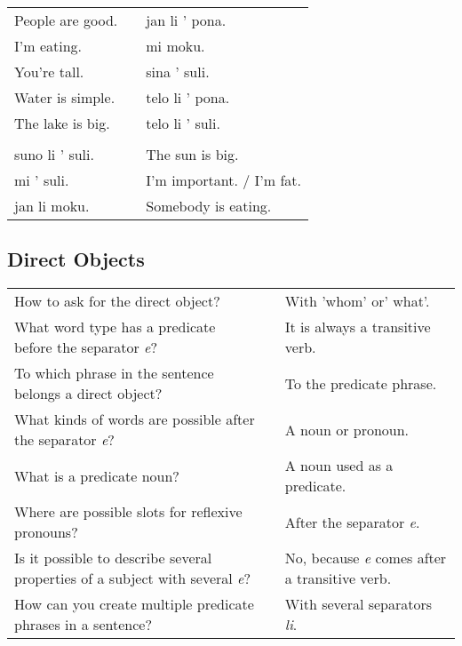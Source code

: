 \begin{supertabular}{p{5,5cm}|ll}
People are good. && jan li ' pona. \\ %
I'm eating. && mi moku. \\ %
You're tall. && sina ' suli. \\ %
Water is simple. && telo li ' pona. \\ %
The lake is big. && telo li ' suli. \\ %
 && \\ %
suno li ' suli. && The sun is big. \\
mi ' suli. && I'm important. / I'm fat. \\
jan li moku. && Somebody is eating. \\
\end{supertabular} 

\newpage
\subsection*{Direct Objects} 
\label{'direct_objects_compund_sentences'}
%
\begin{supertabular}{p{5,5cm}|ll}
How to ask for the direct object? && With 'whom' or' what'. \\ %
What word type has a predicate before the separator \textit{e}?  && It is always a transitive verb. \\ %
To which phrase in the sentence belongs a direct object? && To the predicate phrase. \\ %
What kinds of words are possible after the separator \textit{e}?  && A noun or pronoun. \\ %
What is a predicate noun?  && A noun used as a predicate. \\ %
Where are possible slots for reflexive pronouns? && After the separator \textit{e}. \\ %
Is it possible to describe several properties of a subject with several \textit{e}? && No, because \textit{e} comes after a transitive verb. \\ %
How can you create multiple predicate phrases in a sentence?  && With several separators \textit{li}. \\ %
\end{supertabular} 

